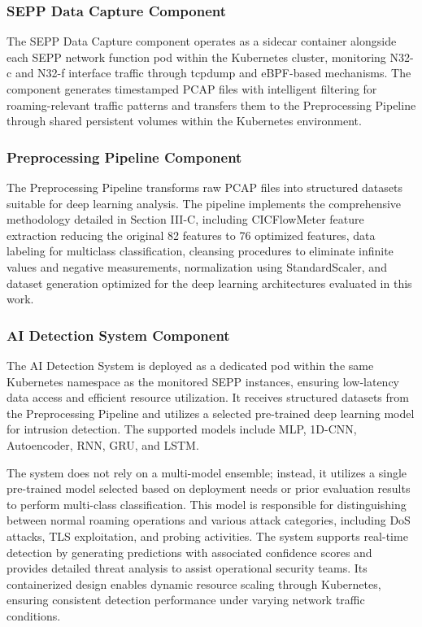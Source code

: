 \documentclass[journal,article,submit,moreauthors,pdftex]{Definitions/tsp}
\begin{document}
\subsubsection{SEPP Data Capture Component}

The SEPP Data Capture component operates as a sidecar container alongside each SEPP network function pod within the Kubernetes cluster, monitoring N32-c and N32-f interface traffic through tcpdump and eBPF-based mechanisms. The component generates timestamped PCAP files with intelligent filtering for roaming-relevant traffic patterns and transfers them to the Preprocessing Pipeline through shared persistent volumes within the Kubernetes environment.

\subsubsection{Preprocessing Pipeline Component}

The Preprocessing Pipeline transforms raw PCAP files into structured datasets suitable for deep learning analysis. The pipeline implements the comprehensive methodology detailed in Section III-C, including CICFlowMeter feature extraction reducing the original 82 features to 76 optimized features, data labeling for multiclass classification, cleansing procedures to eliminate infinite values and negative measurements, normalization using StandardScaler, and dataset generation optimized for the deep learning architectures evaluated in this work.

\subsubsection{AI Detection System Component}

The AI Detection System is deployed as a dedicated pod within the same Kubernetes namespace as the monitored SEPP instances, ensuring low-latency data access and efficient resource utilization. It receives structured datasets from the Preprocessing Pipeline and utilizes a selected pre-trained deep learning model for intrusion detection. The supported models include MLP, 1D-CNN, Autoencoder, RNN, GRU, and LSTM.

The system does not rely on a multi-model ensemble; instead, it utilizes a single pre-trained model selected based on deployment needs or prior evaluation results to perform multi-class classification. This model is responsible for distinguishing between normal roaming operations and various attack categories, including DoS attacks, TLS exploitation, and probing activities. The system supports real-time detection by generating predictions with associated confidence scores and provides detailed threat analysis to assist operational security teams. Its containerized design enables dynamic resource scaling through Kubernetes, ensuring consistent detection performance under varying network traffic conditions.
\end{document}
